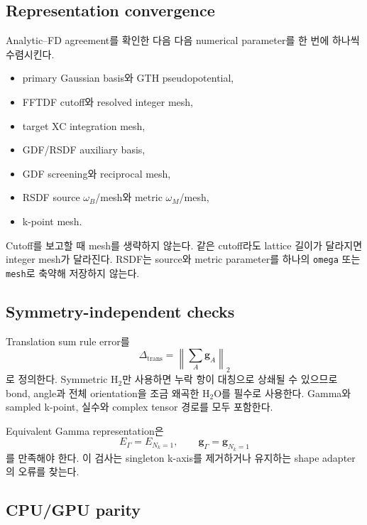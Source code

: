 \subsection{Representation convergence}

Analytic--FD agreement를 확인한 다음 다음 numerical parameter를 한 번에 하나씩
수렴시킨다.

\begin{itemize}
  \item primary Gaussian basis와 GTH pseudopotential,
  \item FFTDF cutoff와 resolved integer mesh,
  \item target XC integration mesh,
  \item GDF/RSDF auxiliary basis,
  \item GDF screening와 reciprocal mesh,
  \item RSDF source $\omega_B$/mesh와 metric $\omega_M$/mesh,
  \item k-point mesh.
\end{itemize}

Cutoff를 보고할 때 mesh를 생략하지 않는다. 같은 cutoff라도 lattice 길이가 달라지면
integer mesh가 달라진다. RSDF는 source와 metric parameter를 하나의
\texttt{omega} 또는 \texttt{mesh}로 축약해 저장하지 않는다.

\subsection{Symmetry-independent checks}

Translation sum rule error를
\begin{equation}
  \Delta_{\mathrm{trans}}
  =\left\|\sum_A\mathbf g_A\right\|_2
  \label{eq:translation-error}
\end{equation}
로 정의한다. Symmetric H$_2$만 사용하면 누락 항이 대칭으로 상쇄될 수 있으므로 bond,
angle과 전체 orientation을 조금 왜곡한 H$_2$O를 필수로 사용한다. Gamma와 sampled
k-point, 실수와 complex tensor 경로를 모두 포함한다.

Equivalent Gamma representation은
\begin{equation}
  E_{\Gamma}=E_{N_k=1},
  \qquad
  \mathbf g_{\Gamma}=\mathbf g_{N_k=1}
  \label{eq:gamma-one-kpoint-parity}
\end{equation}
를 만족해야 한다. 이 검사는 singleton k-axis를 제거하거나 유지하는 shape adapter의
오류를 찾는다.

\subsection{CPU/GPU parity}


